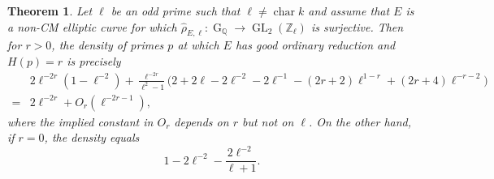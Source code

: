 \documentclass[table]{amsart}
\newtheorem{theorem}{Theorem}[section]
\newcommand{\Z}{\mathbb{Z}}
\newcommand{\Q}{\mathbb{Q}}
\newcommand{\op}[1]{\operatorname{#1}}
\numberwithin{equation}{section}
\begin{document}
\begin{theorem}\label{section 3 thm 1}
    Let $\ell$ be an odd prime such that $\ell\neq \op{char}k$ and assume that $E$ is a non-CM elliptic curve for which $\widehat{\rho}_{E, \ell}:\op{G}_{\Q}\rightarrow \op{GL}_2(\Z_\ell)$ is surjective. Then for $r>0$, the density of primes $p$ at which $E$ has good ordinary reduction and $H(p)=r$ is precisely 
    \[\begin{split}&2\ell^{-2r}(1-\ell^{-2})
+
\frac{\ell^{-2r}}{\ell^{2}-1}
\Big(
2+2\ell-2\ell^{-2}-2\ell^{-1}
-(2r+2)\ell^{1-r}
+(2r+4)\ell^{-r-2}
\Big)\\
=& 2\ell^{-2r}+O_r(\ell^{-2r-1}),\end{split}\]where the implied constant in $O_r$ depends on $r$ but not on $\ell$. On the other hand, if $r=0$, the density equals 
\[
1-2\ell^{-2}-\frac{2\ell^{-2}}{\ell+1}.
\]

\end{theorem}
\end{document}
